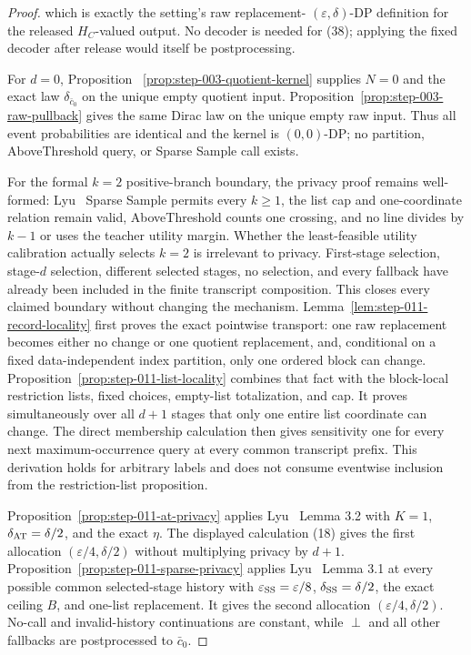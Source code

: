 \begin{proof}
which is exactly the setting's raw replacement-
\((\varepsilon,\delta)\)-DP definition for the released \(H_C\)-valued
output. No decoder is needed for (38); applying the fixed decoder after
release would itself be postprocessing.

For \(d=0\), Proposition
~\ref{prop:step-003-quotient-kernel} supplies \(N=0\) and the exact law
\(\delta_{\bar c_0}\) on the unique empty quotient input. Proposition~\ref{prop:step-003-raw-pullback} gives the same Dirac law on the
unique empty raw input. Thus all event probabilities are identical and the
kernel is \((0,0)\)-DP; no partition, AboveThreshold query, or Sparse Sample
call exists.

For the formal \(k=2\) positive-branch boundary, the privacy proof remains
well-formed: Lyu~\citep{lyu2025} Sparse Sample permits every \(k\geq1\), the list cap and
one-coordinate relation remain valid, AboveThreshold counts one crossing,
and no line divides by \(k-1\) or uses the teacher utility margin. Whether
the  least-feasible utility calibration actually selects \(k=2\)
is irrelevant to privacy. First-stage selection, stage-\(d\) selection,
different selected stages, no selection, and every fallback have already
been included in the finite transcript composition. This closes every
claimed boundary without changing the mechanism. 
Lemma~\ref{lem:step-011-record-locality} first proves the exact pointwise
transport: one raw replacement becomes either no
change or one quotient replacement, and, conditional on a fixed
data-independent index partition, only one ordered block can change.
Proposition~\ref{prop:step-011-list-locality} combines that fact with the
 block-local restriction lists, fixed choices, empty-list
totalization, and cap. It proves simultaneously over all \(d+1\) stages
that only one entire list coordinate can change. The direct membership
calculation then gives sensitivity one for every next maximum-occurrence
query at every common transcript prefix. This derivation holds for arbitrary
labels and does not consume eventwise inclusion from the restriction-list
proposition.

Proposition~\ref{prop:step-011-at-privacy} applies Lyu~\citep{lyu2025} Lemma 3.2
with \(K=1\), \(\delta_{\rm AT}=\delta/2\), and the exact  \(\eta\).
The displayed calculation (18) gives the first allocation
\((\varepsilon/4,\delta/2)\) without multiplying privacy by \(d+1\).
Proposition~\ref{prop:step-011-sparse-privacy} applies Lyu~\citep{lyu2025} Lemma 3.1
at every possible common selected-stage history with
\(\varepsilon_{\rm SS}=\varepsilon/8\),
\(\delta_{\rm SS}=\delta/2\), the exact ceiling \(B\), and one-list
replacement. It gives the second allocation
\((\varepsilon/4,\delta/2)\). No-call and invalid-history continuations are
constant, while \(\perp\) and all other fallbacks are postprocessed to
\(\bar c_0\).


\end{proof}
